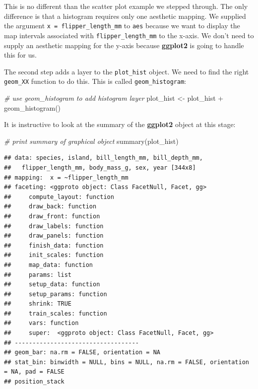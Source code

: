 \documentclass[
]{book}
\newenvironment{Shaded}{\begin{snugshade}}{\end{snugshade}}
\newcommand{\CommentTok}[1]{\textcolor[rgb]{0.56,0.35,0.01}{\textit{#1}}}
\newcommand{\FunctionTok}[1]{\textcolor[rgb]{0.00,0.00,0.00}{#1}}
\newcommand{\NormalTok}[1]{#1}
\newcommand{\OtherTok}[1]{\textcolor[rgb]{0.56,0.35,0.01}{#1}}
\newcommand{\SpecialCharTok}[1]{\textcolor[rgb]{0.00,0.00,0.00}{#1}}
\begin{document}
This is no different than the scatter plot example we stepped through. The only difference is that a histogram requires only one aesthetic mapping. We supplied the argument \texttt{x\ =\ flipper\_length\_mm} to \texttt{aes} because we want to display the map intervals associated with \texttt{flipper\_length\_mm} to the x-axis. We don't need to supply an aesthetic mapping for the y-axis because \textbf{ggplot2} is going to handle this for us.

The second step adds a layer to the \texttt{plot\_hist} object. We need to find the right \texttt{geom\_XX} function to do this. This is called \texttt{geom\_histogram}:

\begin{Shaded}
\begin{Highlighting}[]
\CommentTok{\# use geom\_histogram to add histogram layer}
\NormalTok{plot\_hist }\OtherTok{\textless{}{-}}\NormalTok{ plot\_hist }\SpecialCharTok{+} \FunctionTok{geom\_histogram}\NormalTok{()}
\end{Highlighting}
\end{Shaded}

It is instructive to look at the summary of the \textbf{ggplot2} object at this stage:

\begin{Shaded}
\begin{Highlighting}[]
\CommentTok{\# print summary of graphical object}
\FunctionTok{summary}\NormalTok{(plot\_hist)}
\end{Highlighting}
\end{Shaded}

\begin{verbatim}
## data: species, island, bill_length_mm, bill_depth_mm,
##   flipper_length_mm, body_mass_g, sex, year [344x8]
## mapping:  x = ~flipper_length_mm
## faceting: <ggproto object: Class FacetNull, Facet, gg>
##     compute_layout: function
##     draw_back: function
##     draw_front: function
##     draw_labels: function
##     draw_panels: function
##     finish_data: function
##     init_scales: function
##     map_data: function
##     params: list
##     setup_data: function
##     setup_params: function
##     shrink: TRUE
##     train_scales: function
##     vars: function
##     super:  <ggproto object: Class FacetNull, Facet, gg>
## -----------------------------------
## geom_bar: na.rm = FALSE, orientation = NA
## stat_bin: binwidth = NULL, bins = NULL, na.rm = FALSE, orientation = NA, pad = FALSE
## position_stack
\end{verbatim}
\end{document}
